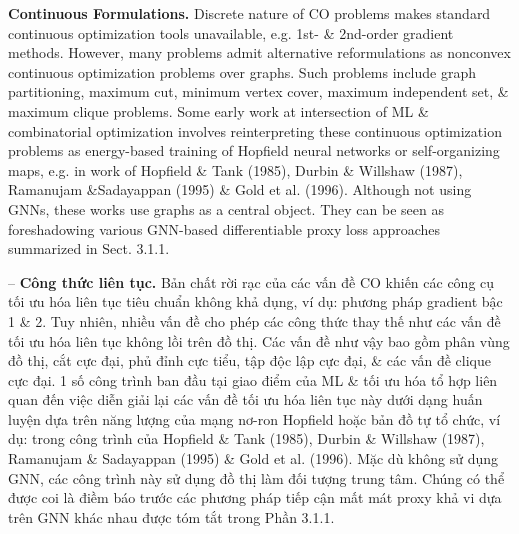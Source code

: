 \documentclass{article}
\begin{document}
\begin{itemize}
\begin{itemize}
        {\bf Continuous Formulations.} Discrete nature of CO problems makes standard continuous optimization tools unavailable, e.g. 1st- \& 2nd-order gradient methods. However, many problems admit alternative reformulations as nonconvex continuous optimization problems over graphs. Such problems include graph partitioning, maximum cut, minimum vertex cover, maximum independent set, \& maximum clique problems. Some early work at intersection of ML \& combinatorial optimization involves reinterpreting these continuous optimization problems as energy-based training of Hopfield neural networks or self-organizing maps, e.g. in work of Hopfield \& Tank (1985), Durbin \& Willshaw (1987), Ramanujam \&Sadayappan (1995) \& Gold et al. (1996). Although not using GNNs, these works use graphs as a central object. They can be seen as foreshadowing various GNN-based differentiable proxy loss approaches summarized in Sect. 3.1.1.

        -- {\bf Công thức liên tục.} Bản chất rời rạc của các vấn đề CO khiến các công cụ tối ưu hóa liên tục tiêu chuẩn không khả dụng, ví dụ: phương pháp gradient bậc 1 \& 2. Tuy nhiên, nhiều vấn đề cho phép các công thức thay thế như các vấn đề tối ưu hóa liên tục không lồi trên đồ thị. Các vấn đề như vậy bao gồm phân vùng đồ thị, cắt cực đại, phủ đỉnh cực tiểu, tập độc lập cực đại, \& các vấn đề clique cực đại. 1 số công trình ban đầu tại giao điểm của ML \& tối ưu hóa tổ hợp liên quan đến việc diễn giải lại các vấn đề tối ưu hóa liên tục này dưới dạng huấn luyện dựa trên năng lượng của mạng nơ-ron Hopfield hoặc bản đồ tự tổ chức, ví dụ: trong công trình của Hopfield \& Tank (1985), Durbin \& Willshaw (1987), Ramanujam \& Sadayappan (1995) \& Gold et al. (1996). Mặc dù không sử dụng GNN, các công trình này sử dụng đồ thị làm đối tượng trung tâm. Chúng có thể được coi là điềm báo trước các phương pháp tiếp cận mất mát proxy khả vi dựa trên GNN khác nhau được tóm tắt trong Phần 3.1.1.


\end{itemize}
\end{itemize}
\end{document}

